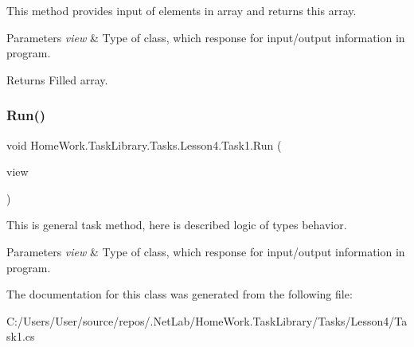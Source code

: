 This method provides input of elements in array and returns this array. 


\begin{DoxyParams}{Parameters}
{\em view} & Type of class, which response for input/output information in program.\\
\hline
\end{DoxyParams}
\begin{DoxyReturn}{Returns}
Filled array.
\end{DoxyReturn}
\mbox{\label{class_home_work_1_1_task_library_1_1_tasks_1_1_lesson4_1_1_task1_a061067e43dd92337aa9914363a3289a1}} 
\subsubsection{\texorpdfstring{Run()}{Run()}}
{\footnotesize\ttfamily void Home\+Work.\+Task\+Library.\+Tasks.\+Lesson4.\+Task1.\+Run (\begin{DoxyParamCaption}\item[{I\+Information}]{view }\end{DoxyParamCaption})}



This is general task method, here is described logic of types behavior. 


\begin{DoxyParams}{Parameters}
{\em view} & Type of class, which response for input/output information in program.\\
\hline
\end{DoxyParams}


The documentation for this class was generated from the following file\+:\begin{DoxyCompactItemize}
\item 
C\+:/\+Users/\+User/source/repos/.\+Net\+Lab/\+Home\+Work.\+Task\+Library/\+Tasks/\+Lesson4/Task1.\+cs\end{DoxyCompactItemize}
